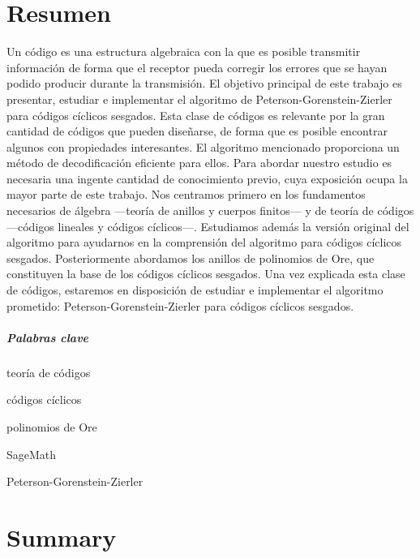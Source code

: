 \chapter*{Resumen}

Un código es una estructura algebraica con la que es posible transmitir información de forma que el receptor pueda corregir los errores que se hayan podido producir durante la transmisión.
El objetivo principal de este trabajo es presentar, estudiar e implementar el algoritmo de Peterson-Gorenstein-Zierler para códigos cíclicos sesgados.
Esta clase de códigos es relevante por la gran cantidad de códigos que pueden diseñarse, de forma que es posible encontrar algunos con propiedades interesantes.
El algoritmo mencionado proporciona un método de decodificación eficiente para ellos.
Para abordar nuestro estudio es necesaria una ingente cantidad de conocimiento previo, cuya exposición ocupa la mayor parte de este trabajo.
Nos centramos primero en los fundamentos necesarios de álgebra —teoría de anillos y cuerpos finitos— y de teoría de códigos —códigos lineales y códigos cíclicos—.
Estudiamos además la versión original del algoritmo  para ayudarnos en la comprensión del algoritmo para códigos cíclicos sesgados.
Posteriormente abordamos los anillos de polinomios de Ore, que constituyen la base de los códigos cíclicos sesgados.
Una vez explicada esta clase de códigos, estaremos en disposición de estudiar e implementar el algoritmo prometido: Peterson-Gorenstein-Zierler para códigos cíclicos sesgados.

\paragraph{Palabras clave}
\begin{itemize*}[label=,itemsep=4em,itemjoin=\hspace{2em}]
  \item teoría de códigos
  \item códigos cíclicos
  \item polinomios de Ore
  \item SageMath
  \item Peterson-Gorenstein-Zierler
\end{itemize*}

\chapter*{Summary}

